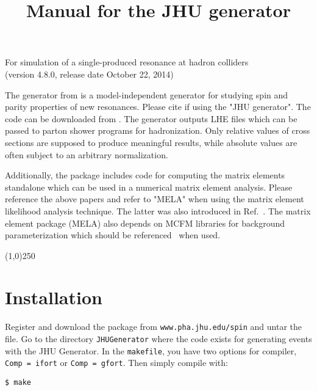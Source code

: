 \documentclass[aps,superscriptaddress,nofootinbib]{revtex4}
\begin{document}
\vspace{0.6cm}

\title{ 
\large
Manual for the JHU generator
}
\maketitle
\begin{center}
\small
For simulation of a single-produced resonance at hadron colliders \\
(version 4.8.0, release date October 22, 2014) \\
\normalsize
\end{center}

\noindent
The generator from \cite{Gao:2010qx,Bolognesi:2012,Anderson:2013} is a model-independent generator for studying spin and parity properties of new resonances.  
Please cite \cite{Gao:2010qx,Bolognesi:2012,Anderson:2013} if using the "JHU generator".  
The code can be downloaded from \cite{thesite}.  
The generator outputs LHE files which can be passed to parton shower programs for hadronization.  
Only relative values of cross sections are supposed to produce meaningful results, while absolute values are often subject to an arbitrary normalization.

Additionally, the package includes code for computing the matrix elements standalone which can be used in a numerical matrix element analysis.  
Please reference the above papers and refer to "MELA" when using the matrix element likelihood analysis technique. 
The latter was also introduced in Ref.~\cite{Chatrchyan:2012ufa}. The matrix element package (MELA) also depends 
on MCFM libraries for background parameterization which should be referenced~\cite{Campbell:2010ff} when used. 

\vspace{0.5cm}
\begin{center}
\line(1,0){250}
\end{center}
\vspace{0.5cm}
\tableofcontents
\begin{center}
\end{center}
\vspace{0.5cm}


\section{ Installation }

\noindent
Register and download the package from \verb|www.pha.jhu.edu/spin| and untar the file.  Go to the directory \verb|JHUGenerator| where the code exists for generating events with the JHU Generator. In the \verb|makefile|, you have two options for compiler, \verb|Comp = ifort| or \verb|Comp = gfort|.  Then simply compile with:
\begin{verbatim}
$ make
\end{verbatim}
\end{document}
